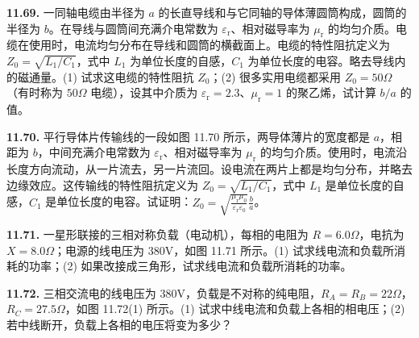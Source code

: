 \begin{center}
  \begin{minipage}[b]{0.47\linewidth}
    \centering
  \end{minipage}\hfill
  \begin{minipage}[b]{0.47\linewidth}
    \centering
  \end{minipage}
\end{center}

\vfill
\newpage

\textbf{11.69.} 一同轴电缆由半径为 $a$ 的长直导线和与它同轴的导体薄圆筒构成，圆筒的半径为 $b$。在导线与圆筒间充满介电常数为 $\varepsilon_{\mathrm{r}}$、相对磁导率为 $\mu_{\mathrm{r}}$ 的均匀介质。电缆在使用时，电流均匀分布在导线和圆筒的横截面上。电缆的特性阻抗定义为 $Z_0 = \sqrt{L_1 / C_1}$，式中 $L_{1}$ 为单位长度的自感，$C_{1}$ 为单位长度的电容。略去导线内的磁通量。(1) 试求这电缆的特性阻抗 $Z_0$；(2) 很多实用电缆都采用 $Z_0 = 50\Omega$（有时称为 $50\Omega$ 电缆），设其中介质为 $\varepsilon_{\mathrm{r}} = 2.3$、$\mu_{\mathrm{r}} = 1$ 的聚乙烯，试计算 $b / a$ 的值。

\vfill
\newpage

\textbf{11.70.} 平行导体片传输线的一段如图 11.70 所示，两导体薄片的宽度都是 $a$，相距为 $b$，中间充满介电常数为 $\varepsilon_{\mathrm{r}}$、相对磁导率为 $\mu_{\mathrm{r}}$ 的均匀介质。使用时，电流沿长度方向流动，从一片流去，另一片流回。设电流在两片上都是均匀分布，并略去边缘效应。这传输线的特性阻抗定义为 $Z_{0} = \sqrt{L_{1} / C_{1}}$，式中 $L_{1}$ 是单位长度的自感，$C_{1}$ 是单位长度的电容。试证明：$\displaystyle Z_{0} = \sqrt{\frac{\mu_{\mathrm{r}} \mu_{0}}{\varepsilon_{\mathrm{r}} \varepsilon_{0}}}\frac{b}{a}$。

\begin{center}
\end{center}

\vfill
\newpage

\textbf{11.71.} 一星形联接的三相对称负载（电动机），每相的电阻为 $R = 6.0\Omega$，电抗为 $X = 8.0\Omega$；电源的线电压为 $380\mathrm{V}$，如图 11.71 所示。(1) 试求线电流和负载所消耗的功率；(2) 如果改接成三角形，试求线电流和负载所消耗的功率。

\begin{center}
\end{center}

\vfill
\newpage

\textbf{11.72.} 三相交流电的线电压为 $380\mathrm{V}$，负载是不对称的纯电阻，$R_{A} = R_{B} = 22\Omega$，$R_{C} = 27.5\Omega$，如图 11.72(1) 所示。(1) 试求中线电流和负载上各相的相电压；(2) 若中线断开，负载上各相的电压将变为多少？

\begin{center}
\end{center}

\vfill
\newpage
